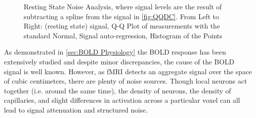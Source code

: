 \begin{figure}
\centering
{}
\caption[Resting State Noise Analysis, where
signal levels are the result of subtracting a spline from the signal in 
\autoref{fig:QQDC}]
{Resting State Noise Analysis, where
signal levels are the result of subtracting a spline from the signal in 
\autoref{fig:QQDC}.
From Left to Right:
(resting state) signal, Q-Q Plot of measurements with the standard Normal,
Signal auto-regression, Histogram of the Points}
\label{fig:QQSpline}
\end{figure}

As demonstrated in \autoref{sec:BOLD Physiology} the \ac{BOLD} response has been
extensively studied and despite minor discrepancies, the cause of the \ac{BOLD}
signal is well known. However, as \ac{fMRI} detects an
aggregate signal over the space of cubic centimeters, there are
plenty of noise sources. Though local neurons act
together (i.e. around the same time), the density of neurons, the
density of capillaries, and slight differences in activation across
a particular voxel can all lead to signal attenuation and structured noise.

